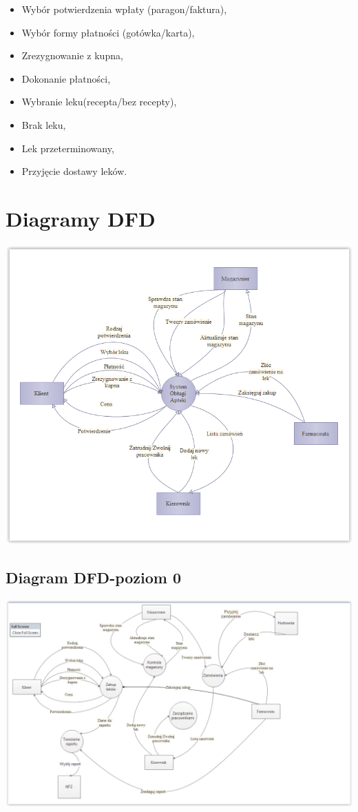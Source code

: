 \documentclass[a4paper, 11pt]{article}
\begin{document}
	\begin{itemize}
	\item Wybór potwierdzenia wpłaty (paragon/faktura),
	\item Wybór formy płatności (gotówka/karta),
	\item Zrezygnowanie z kupna,
	\item Dokonanie płatności,
	\item Wybranie leku(recepta/bez recepty),
	\item Brak leku,
	\item Lek przeterminowany,
	\item Przyjęcie dostawy leków.
	\end{itemize}
	

	\section{Diagramy DFD}
	\includegraphics[scale=0.6]{zd.PNG} 
	\subsection{Diagram DFD-poziom 0}
		\includegraphics[scale=0.6]{zd2.PNG} 
\end{document}
